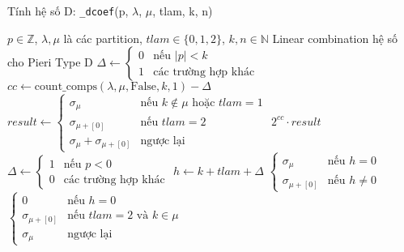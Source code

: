 \begin{algorithm}[H]
\caption{Tính hệ số D: \texttt{\_dcoef}(p, $\lambda$, $\mu$, tlam, k, n)}
\begin{algorithmic}[1]
\REQUIRE $p \in \mathbb{Z}$, $\lambda, \mu$ là các partition, $tlam \in \{0,1,2\}$, $k, n \in \mathbb{N}$
\ENSURE Linear combination hệ số cho Pieri Type D
\STATE $\Delta \gets \begin{cases}
    0 & \text{nếu } |p| < k \\
    1 & \text{các trường hợp khác}
\end{cases}$
\STATE $cc \gets \text{count\_comps}(\lambda, \mu, \text{False}, k, 1) - \Delta$
    \STATE $result \gets \begin{cases}
        \sigma_\mu & \text{nếu } k \notin \mu \text{ hoặc } tlam = 1 \\
        \sigma_{\mu + [0]} & \text{nếu } tlam = 2 \\
        \sigma_\mu + \sigma_{\mu + [0]} & \text{ngược lại}
    \end{cases}$
    \RETURN $2^{cc} \cdot result$
\ENDIF
\STATE $\Delta \gets \begin{cases}
    1 & \text{nếu } p < 0 \\
    0 & \text{các trường hợp khác}
\end{cases}$
\STATE $h \gets k + tlam + \Delta$
    \RETURN $\begin{cases}
        \sigma_\mu & \text{nếu } h = 0 \\
        \sigma_{\mu + [0]} & \text{nếu } h \neq 0
    \end{cases}$
\ENDIF
\RETURN $\begin{cases}
    0 & \text{nếu } h = 0 \\
    \sigma_{\mu + [0]} & \text{nếu } tlam = 2 \text{ và } k \in \mu \\
    \sigma_\mu & \text{ngược lại}
\end{cases}$
\end{algorithmic}
\end{algorithm}

